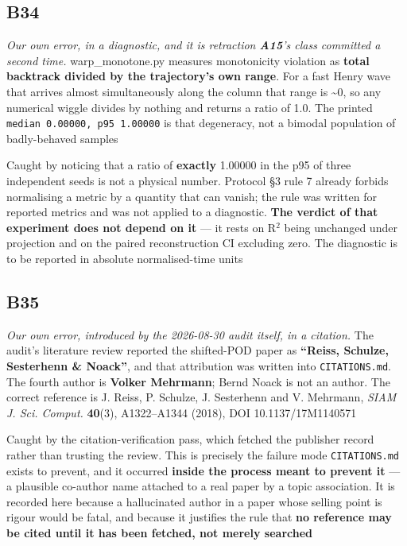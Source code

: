 \documentclass[10pt]{article}
\begin{document}
\subsection*{B34}\label{led:B34}
\begin{description}[leftmargin=0pt,itemsep=1pt]
\item[Defect.] \emph{Our own error, in a diagnostic, and it is retraction \textbf{A15}'s class committed a second time.} warp\_monotone.py measures monotonicity violation as \textbf{total backtrack divided by the trajectory's own range}. For a fast Henry wave that arrives almost simultaneously along the column that range is \textasciitilde{}0, so any numerical wiggle divides by nothing and returns a ratio of 1.0. The printed \texttt{median 0.00000, p95 1.00000} is that degeneracy, not a bimodal population of badly-behaved samples
\item[How it was caught.] Caught by noticing that a ratio of \textbf{exactly} 1.00000 in the p95 of three independent seeds is not a physical number. Protocol §3 rule 7 already forbids normalising a metric by a quantity that can vanish; the rule was written for reported metrics and was not applied to a diagnostic. \textbf{The verdict of that experiment does not depend on it} --- it rests on R$^2$ being unchanged under projection and on the paired reconstruction CI excluding zero. The diagnostic is to be reported in absolute normalised-time units
\end{description}
\subsection*{B35}\label{led:B35}
\begin{description}[leftmargin=0pt,itemsep=1pt]
\item[Defect.] \emph{Our own error, introduced by the 2026-08-30 audit itself, in a citation.} The audit's literature review reported the shifted-POD paper as \textbf{``Reiss, Schulze, Sesterhenn \& Noack''}, and that attribution was written into \texttt{CITATIONS.md}. The fourth author is \textbf{Volker Mehrmann}; Bernd Noack is not an author. The correct reference is J. Reiss, P. Schulze, J. Sesterhenn and V. Mehrmann, \emph{SIAM J. Sci. Comput.} \textbf{40}(3), A1322--A1344 (2018), DOI 10.1137/17M1140571
\item[How it was caught.] Caught by the citation-verification pass, which fetched the publisher record rather than trusting the review. This is precisely the failure mode \texttt{CITATIONS.md} exists to prevent, and it occurred \textbf{inside the process meant to prevent it} --- a plausible co-author name attached to a real paper by a topic association. It is recorded here because a hallucinated author in a paper whose selling point is rigour would be fatal, and because it justifies the rule that \textbf{no reference may be cited until it has been fetched, not merely searched}
\end{description}
\end{document}
